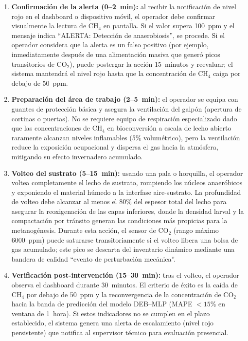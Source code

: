 \begin{enumerate}
    \item \textbf{Confirmación de la alerta (0--2~min):} al recibir la notificación de nivel rojo en el dashboard o dispositivo móvil, el operador debe confirmar visualmente la lectura de CH$_4$ en pantalla. Si el valor supera 100~ppm y el mensaje indica ``ALERTA: Detección de anaerobiosis'', se procede. Si el operador considera que la alerta es un falso positivo (por ejemplo, inmediatamente después de una alimentación masiva que generó picos transitorios de CO$_2$), puede postergar la acción 15~minutos y reevaluar; el sistema mantendrá el nivel rojo hasta que la concentración de CH$_4$ caiga por debajo de 50~ppm.
    
    \item \textbf{Preparación del área de trabajo (2--5~min):} el operador se equipa con guantes de protección básica y asegura la ventilación del galpón (apertura de cortinas o puertas). No se requiere equipo de respiración especializado dado que las concentraciones de CH$_4$ en bioconversión a escala de lecho abierto raramente alcanzan niveles inflamables (5\% volumétrico), pero la ventilación reduce la exposición ocupacional y dispersa el gas hacia la atmósfera, mitigando su efecto invernadero acumulado.
    
    \item \textbf{Volteo del sustrato (5--15~min):} usando una pala o horquilla, el operador voltea completamente el lecho de sustrato, rompiendo los núcleos anaeróbicos y exponiendo el material húmedo a la interfase aire-sustrato. La profundidad de volteo debe alcanzar al menos el 80\% del espesor total del lecho para asegurar la reoxigenación de las capas inferiores, donde la densidad larval y la compactación por tránsito generan las condiciones más propicias para la metanogénesis. Durante esta acción, el sensor de CO$_2$ (rango máximo 6000~ppm) puede saturarse transitoriamente si el volteo libera una bolsa de gas acumulado; este pico se descarta del inventario dinámico mediante una bandera de calidad ``evento de perturbación mecánica''.
    
    \item \textbf{Verificación post-intervención (15--30~min):} tras el volteo, el operador observa el dashboard durante 30~minutos. El criterio de éxito es la caída de CH$_4$ por debajo de 50~ppm y la reconvergencia de la concentración de CO$_2$ hacia la banda de predicción del modelo DEB--MLP (MAPE $< 15$\% en ventana de 1~hora). Si estos indicadores no se cumplen en el plazo establecido, el sistema genera una alerta de escalamiento (nivel rojo persistente) que notifica al supervisor técnico para evaluación presencial.
\end{enumerate}

